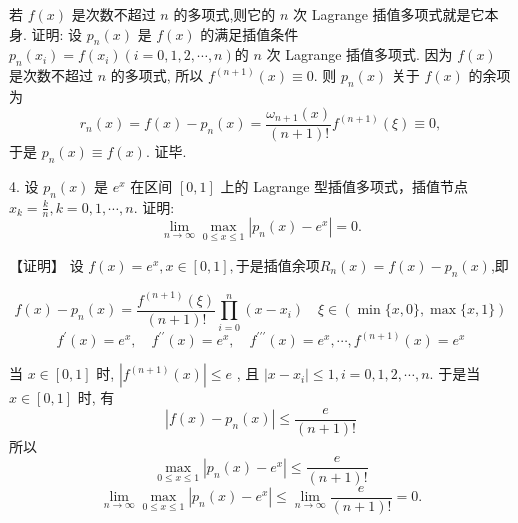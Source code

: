 \begin{tcolorbox}
\begin{tcolorbox}[title=补充一个推论（可直接用于上面的证明中）]
   若 $ f(x) $ 是次数不超过 $ n $ 的多项式,则它的 $ n $ 次 Lagrange 插值多项式就是它本身.
\tcblower
证明: 设 $ p_{n}(x) $ 是 $ f(x) $ 的满足插值条件 $ p_{n}\left(x_{i}\right)=f\left(x_{i}\right)(i=0,1,2, \cdots, n) $的 $ n $ 次 Lagrange 插值多项式. 因为 $ f(x) $ 是次数不超过 $ n $ 的多项式, 所以 $ f^{(n+1)}(x) \equiv 0 $.
则 $ p_{n}(x) $ 关于 $ f(x) $ 的余项为
$$
r_{n}(x)=f(x)-p_{n}(x)=\frac{\omega_{n+1}(x)}{(n+1) !} f^{(n+1)}(\xi) \equiv 0,
$$
于是 $ p_{n}(x) \equiv f(x) $. 证毕.
\end{tcolorbox}

\end{tcolorbox}




\begin{tcolorbox}[breakable,enhanced,arc=0mm,outer arc=0mm,
		boxrule=0pt,toprule=1pt,leftrule=0pt,bottomrule=1pt, rightrule=0pt,left=0.2cm,right=0.2cm,
		titlerule=0.5em,toptitle=0.1cm,bottomtitle=-0.1cm,top=0.2cm,
		colframe=white!10!biru,colback=white!90!biru,coltitle=white,
            coltext=black,title =2024-03-10, title style={white!10!biru}, before skip=8pt, after skip=8pt,before upper=\hspace{2em},
		fonttitle=\bfseries,fontupper=\normalsize]
  
  4. 设 $ p_{n}(x) $ 是 $ e^{x} $ 在区间 $ [0,1] $ 上的 Lagrange 型插值多项式，插值节点 $ x_{k}=\frac{k}{n}, k=0,1, \cdots, n $. 证明:
$$
\lim _{n \rightarrow \infty} \max _{0 \leq x \leq 1}\left|p_{n}(x)-e^{x}\right|=0 .
$$

 \tcblower
【证明】 设 $ f(x)=e^x, x \in[0,1],$于是插值余项$R_n(x)=f(x)-p_{n}(x)$,即

$$ f(x)-p_{n}(x)=\frac{f^{(n+1)}(\xi)}{(n+1) !} \prod_{i=0}^{n}\left(x-x_{i}\right) \quad \xi \in(\min \{x, 0\}, \max \{x, 1\}) $$
$$
f^{\prime}(x)=e^x, \quad f^{\prime \prime}(x)=e^x ,\quad f^{\prime \prime \prime}(x)=e^x, \cdots, f^{(n+1)}(x)=e^x
$$

当 $ x \in[0,1] $ 时, $ \left|f^{(n+1)}(x)\right| \leqslant e $ ,
且 $ \left|x-x_{i}\right| \leqslant 1, i=0,1,2, \cdots, n $.
于是当 $ x \in[0,1] $ 时, 有
$$
\left|f(x)-p_{n}(x)\right| \leqslant \frac{e}{(n+1) !}
$$
所以
$$
\max _{0 \leqslant x \leqslant 1}\left|p_n(x)-e^x\right| \leqslant \frac{e}{(n+1) !}
$$
$$
\lim _{n \rightarrow \infty} \max _{0 \leqslant x \leqslant 1}\left|p_n(x)-e^x\right| \leqslant \lim _{n \rightarrow \infty} \frac{e}{(n+1) !}=0 .
$$

\end{tcolorbox}


